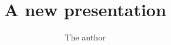 \documentclass{beamer}
\title{A new presentation}
\author{The author}
\institute{The Institute that pays him}
\begin{document}
\begin{frame}
    \titlepage
\end{frame}
\end{document}
